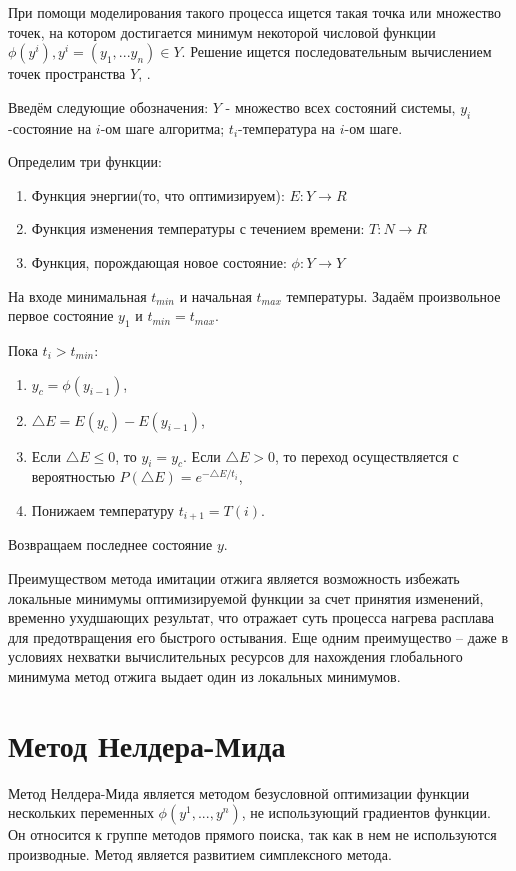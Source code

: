 \documentclass[11pt, oneside, a4paper]{article}
\begin{document}
При помощи моделирования такого процесса ищется такая точка или множество точек, на котором достигается минимум некоторой числовой функции $\phi(y^i),y^i=(y_1,...y_n)\in Y$. Решение ищется последовательным вычислением точек пространства $Y$\cite{fio_bib16}, \cite{fio_bib20}. 


Введём следующие обозначения: $Y$ - множество всех состояний системы, $y_i$-состояние на $i$-ом шаге алгоритма; $t_i$-температура на $i$-ом шаге.


Определим три функции:
\begin{enumerate}
\item Функция энергии(то, что оптимизируем):   $E:Y\rightarrow R$
\item Функция изменения температуры с течением времени:  
$T:N\rightarrow R$
\item Функция, порождающая новое состояние:  
$\phi:Y\rightarrow Y$
\end{enumerate}
На входе минимальная $t_{min} $ и начальная $t_{max}$ температуры. Задаём произвольное первое состояние $y_1$ и $t_{min}=t_{max}$.

Пока $t_i>t_{min}$:
\begin{enumerate}
\item $y_c=\phi(y_{i-1})$,
\item $\triangle E=E(y_c)-E(y_{i-1})$,
\item Если $\triangle E \leq 0$, то $y_i=y_c$. Если $\triangle E >0$, то переход осуществляется с вероятностью $P(\triangle E)=e^{- \triangle E /t_i}$,
\item Понижаем температуру $t_{i+1}=T(i)$.
\end{enumerate}
Возвращаем последнее состояние $y$. 

Преимуществом метода имитации отжига является возможность избежать локальные минимумы оптимизируемой функции за счет принятия изменений, временно ухудшающих результат, что отражает суть процесса нагрева расплава для предотвращения его быстрого остывания. Еще одним преимущество – даже в условиях нехватки вычислительных ресурсов для нахождения глобального минимума метод отжига выдает один из локальных минимумов. 

\section{Метод Нелдера-Мида}
Метод Нелдера-Мида является методом безусловной оптимизации \cite{fio_bib19} функции нескольких  переменных $\phi(y^1,...,y^n )$, не использующий градиентов функции. Он относится к группе методов прямого поиска, так как в нем не используются производные. Метод является развитием симплексного метода.
 
\end{document}
